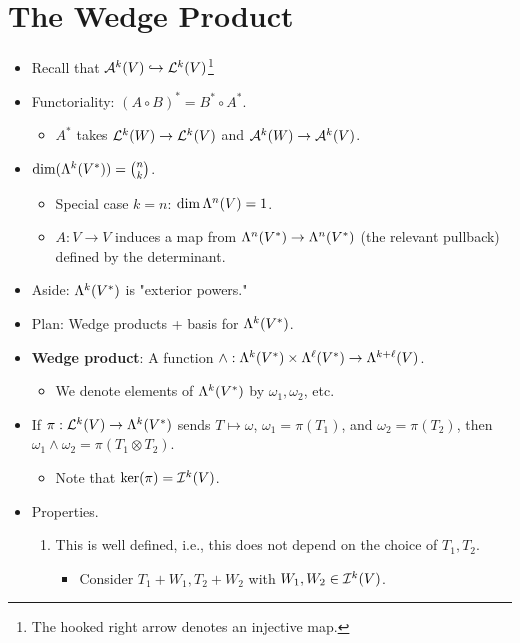 \documentclass[../notes.tex]{subfiles}
\begin{document}
\section{The Wedge Product}
\begin{itemize}
    \item {}Recall that $\alt[k]{V}\hookrightarrow\lin[k]{V}$\footnote{The hooked right arrow denotes an injective map.}
    \item Functoriality: $(A\circ B)^*=B^*\circ A^*$.
    \begin{itemize}
        \item $A^*$ takes $\lin[k]{W}\to\lin[k]{V}$ and $\alt[k]{W}\to\alt[k]{V}$.
    \end{itemize}
    \item $\dim(\lam[k]{V^*})=\binom{n}{k}$.
    \begin{itemize}
        \item Special case $k=n$: $\dim\lam[n]{V}=1$.
        \item $A:V\to V$ induces a map from $\lam[n]{V^*}\to\lam[n]{V^*}$ (the relevant pullback) defined by the determinant.
    \end{itemize}
    \item Aside: $\lam[k]{V^*}$ is "exterior powers."
    \item Plan: Wedge products + basis for $\lam[k]{V^*}$.
    \item \textbf{Wedge product}: A function $\wedge:\lam[k]{V^*}\times\lam[\ell]{V^*}\to\lam[k+\ell]{V}$. 
    \begin{itemize}
        \item We denote elements of $\lam[k]{V^*}$ by $\omega_1,\omega_2$, etc.
    \end{itemize}
    \item If $\pi:\lin[k]{V}\to\lam[k]{V^*}$ sends $T\mapsto\omega$, $\omega_1=\pi(T_1)$, and $\omega_2=\pi(T_2)$, then $\omega_1\wedge\omega_2=\pi(T_1\otimes T_2)$.
    \begin{itemize}
        \item Note that $\ker(\pi)=\ide[k]{V}$.
    \end{itemize}
    \item Properties.
    \begin{enumerate}
        \item This is well defined, i.e., this does not depend on the choice of $T_1,T_2$.
        \begin{itemize}
            \item Consider $T_1+W_1,T_2+W_2$ with $W_1,W_2\in\ide[k]{V}$.

\end{itemize}
\end{enumerate}
\end{itemize}
\end{document}

